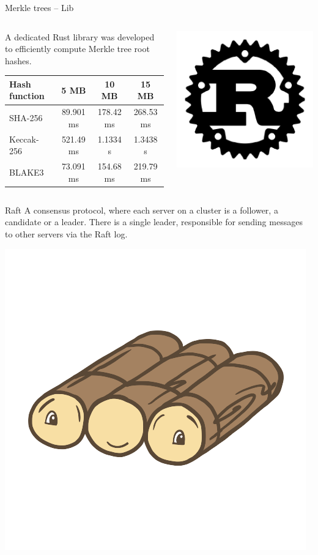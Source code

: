 \begin{frame}{Merkle trees -- Lib}
    \begin{columns}[c]
        \begin{column}{0.7\textwidth}
            A dedicated Rust library was developed to efficiently compute Merkle tree root hashes.
            \begin{table}[h!]
                \centering
                \footnotesize %
                \begin{tabular}{|l|c|c|c|}
                \hline
                    \textbf{Hash function} & \textbf{5 MB} & \textbf{10 MB} & \textbf{15 MB} \\
                \hline
                    SHA-256   & 89.901 ms  & 178.42 ms  & 268.53 ms \\
                    Keccak-256 & 521.49 ms & 1.1334 s   & 1.3438 s \\
                    BLAKE3    & 73.091 ms  & 154.68 ms  & 219.79 ms \\
                \hline
                \end{tabular}
            \end{table}
        \end{column}
        \begin{column}{0.3\textwidth}
            \centering
            \includegraphics[width=.4\linewidth]{static/rust-logo.png}
        \end{column}
    \end{columns}

\end{frame}

\begin{frame}{Raft}
A consensus protocol, where each server on a cluster is a follower, a candidate
or a leader. There is a single leader, responsible for sending messages to other servers via the Raft log.

\centering
\includegraphics[width=.4\linewidth]{static/raft-logo.png}

\end{frame}
